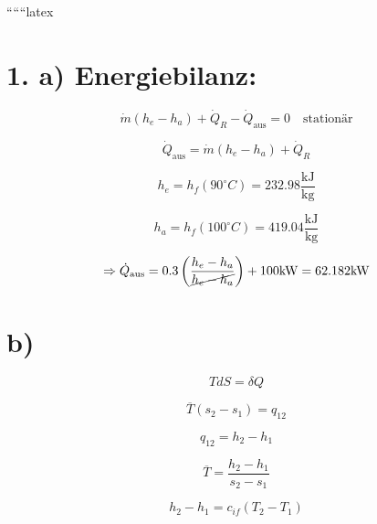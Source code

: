 
``````latex

\section*{1. a) Energiebilanz:}

\begin{equation*}
\dot{m} (h_e - h_a) + \dot{Q}_R - \dot{Q}_{\text{aus}} = 0 \quad \text{stationär}
\end{equation*}

\begin{equation*}
\dot{Q}_{\text{aus}} = \dot{m} (h_e - h_a) + \dot{Q}_R
\end{equation*}

\begin{equation*}
h_e = h_f (90^\circ C) = 232.98 \frac{\text{kJ}}{\text{kg}}
\end{equation*}

\begin{equation*}
h_a = h_f (100^\circ C) = 419.04 \frac{\text{kJ}}{\text{kg}}
\end{equation*}

\begin{equation*}
\Rightarrow \dot{Q}_{\text{aus}} = 0.3 \left( \frac{h_e - h_a}{\cancel{h_e - h_a}} \right) + 100 \text{kW} = 62.182 \text{kW}
\end{equation*}

\noindent
{}

\section*{b)}

\begin{equation*}
TdS = \delta Q
\end{equation*}

\begin{equation*}
\overline{T} (s_2 - s_1) = q_{12}
\end{equation*}

\begin{equation*}
q_{12} = h_2 - h_1
\end{equation*}

\begin{equation*}
\overline{T} = \frac{h_2 - h_1}{s_2 - s_1}
\end{equation*}

\begin{equation*}
h_2 - h_1 = c_{if} (T_2 - T_1)
\end{equation*}

